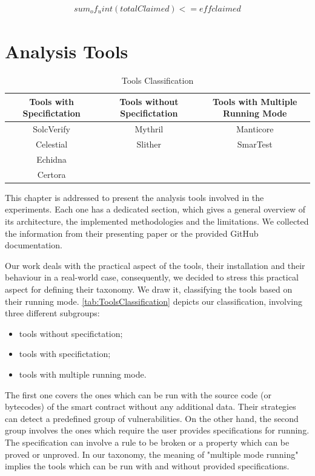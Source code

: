 \begin{equation}
    \begin{split}
        sum_of_uint(totalClaimed) <= effclaimed
    \end{split}
\end{equation}

\chapter{Analysis Tools}
\label{ch:Tools}
\begin{table}
    \caption{Tools Classification}
        \label{tab:ToolsClassification}
        \begin{tabular}{ccc}
        \toprule
            Tools with Specifictation & Tools without Specifictation & Tools with Multiple Running Mode \\
            \midrule
            SolcVerify  & Mythril &  Manticore \\
            Celestial & Slither &  SmarTest \\
            Echidna & & \\
            Certora & & \\ 
        \bottomrule
        \end{tabular}
    \end{table}

This chapter is addressed to present the analysis tools involved in the experiments. 
Each one has a dedicated section, which gives a general overview of its architecture, the implemented methodologies and the limitations. 
We collected the information from their presenting paper or the provided GitHub documentation.

Our work deals with the practical aspect of the tools, their installation and their behaviour in a real-world case, consequently, 
we decided to stress this practical aspect for defining their taxonomy.
We draw it, classifying the tools based on their running mode. \autoref{tab:ToolsClassification} depicts our classification, involving three different subgroups:
\begin{itemize}
    \item tools without specifictation;
    \item tools with specifictation;
    \item tools with multiple running mode.
\end{itemize}
The first one covers the ones which can be run with the source code (or bytecodes) of the smart contract without any additional data. Their strategies can detect a predefined group of vulnerabilities. 
On the other hand, the second group involves the ones which require the user provides specifications for running. The specification can involve a rule to be broken or a property which can be proved or unproved. 
In our taxonomy, the meaning of "multiple mode running" implies the tools which can be run with and without provided specifications. 

